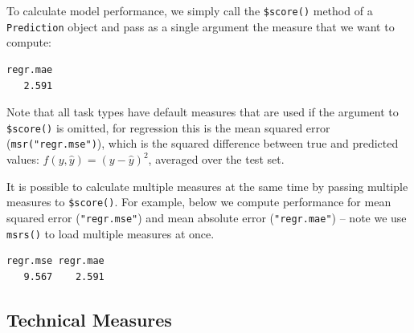 To calculate model performance, we simply call the
\texttt{\$score()}
method of a \texttt{Prediction} object and pass as a single argument the
measure that we want to compute:

\begin{Shaded}
\begin{Highlighting}[]
\SpecialCharTok{$}
\end{Highlighting}
\end{Shaded}

\begin{verbatim}
regr.mae 
   2.591 
\end{verbatim}

Note that all task types have default measures that are used if the
argument to \texttt{\$score()} is omitted, for regression this is the
mean squared error (\texttt{msr("regr.mse")}), which is the squared
difference between true and predicted values:
\(f(y, \hat{y}) = (y - \hat{y})^2\), averaged over the test set.

It is possible to calculate multiple measures at the same time by
passing multiple measures to \texttt{\$score()}. For example, below we
compute performance for mean squared error (\texttt{"regr.mse"}) and
mean absolute error (\texttt{"regr.mae"}) -- note we use
\texttt{msrs()}
to load multiple measures at once.

\begin{Shaded}
\begin{Highlighting}[]
\OtherTok{=} \NormalTok{(}\NormalTok{(}\NormalTok{, }\NormalTok{))}
\SpecialCharTok{$}
\end{Highlighting}
\end{Shaded}

\begin{verbatim}
regr.mse regr.mae 
   9.567    2.591 
\end{verbatim}

\hypertarget{sec-basics-measures-tech}{%
\subsection{Technical Measures}\label{sec-basics-measures-tech}}

